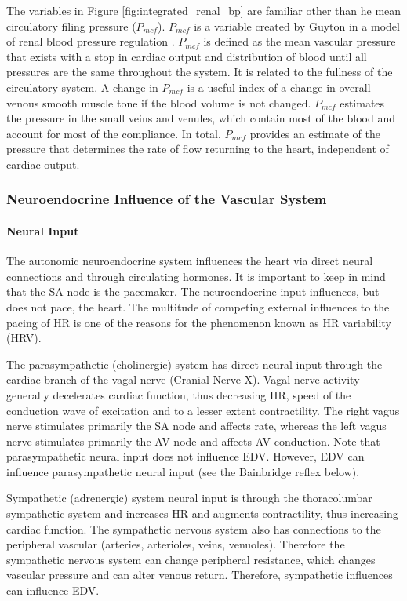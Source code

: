 The variables in Figure \ref{fig:integrated_renal_bp} are familiar other than he mean circulatory filing pressure ($P_{mcf}$). $P_{mcf}$ is a variable created by Guyton in a model of renal blood pressure regulation \cite{rothe_mean_1993}. $P_{mcf}$ is defined as the mean vascular pressure that exists with a stop in cardiac output and distribution of blood until all pressures are the same throughout the system. It is related to the fullness of the circulatory system. A change in $P_{mcf}$ is a useful index of a change in overall venous smooth muscle tone if the blood volume is not changed. $P_{mcf}$ estimates the pressure in the small veins and venules, which contain most of the blood and account for most of the compliance. In total, $P_{mcf}$ provides an estimate of the pressure that determines the rate of flow returning to the heart, independent of cardiac output.



\subsubsection{Neuroendocrine Influence of the Vascular System}

\paragraph{Neural Input}

The autonomic neuroendocrine system influences the heart via direct neural connections and through circulating hormones. It is important to keep in mind that the SA node is the pacemaker. The neuroendocrine input influences, but does not pace, the heart. The multitude of competing external influences to the pacing of HR is one of the reasons for the phenomenon known as HR variability (HRV). 

The parasympathetic (cholinergic) system has direct neural input through the cardiac branch of the vagal nerve (Cranial Nerve X). Vagal nerve activity generally decelerates cardiac function, thus decreasing HR, speed of the conduction wave of excitation and to a lesser extent contractility. The right vagus nerve stimulates primarily the SA node and affects rate, whereas the left vagus nerve stimulates primarily the AV node and affects AV conduction. Note that parasympathetic neural input does not influence EDV. However, EDV can influence parasympathetic neural input (see the Bainbridge reflex below).

Sympathetic (adrenergic) system neural input is through the thoracolumbar sympathetic system and increases HR and augments contractility, thus increasing cardiac function. The sympathetic nervous system also has connections to the peripheral vascular (arteries, arterioles, veins, venuoles). Therefore the sympathetic nervous system can change peripheral resistance, which changes vascular pressure and can alter venous return. Therefore, sympathetic influences can influence EDV. 

